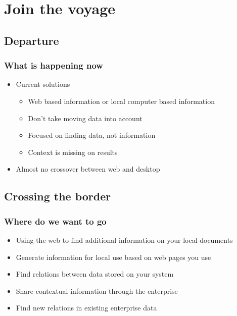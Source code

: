 \documentclass{beamer}
\begin{document}
\section{Join the voyage}

\subsection[Departure]{Departure}

\begin{frame}
\frametitle{What is happening now}

\begin{itemize}
  \item Current solutions
  \begin{itemize}
  	\item Web based information or local computer based information
  	\item Don't take moving data into account
   	\item Focused on finding data, not information 
  	\item Context is missing on results
  \end{itemize}
  \item	Almost no crossover between web and desktop
  \end{itemize}
\end{frame}

\subsection[Crossing the border]{Crossing the border}

\begin{frame}
\frametitle{Where do we want to go}

\begin{itemize}
  \item Using the web to find additional information on your local documents
  \item Generate information for local use based on web pages you use
  \item Find relations between data stored on your system
  \item Share contextual information through the enterprise
  \item Find new relations in existing enterprise data
\end{itemize}
\end{frame}
\end{document}
